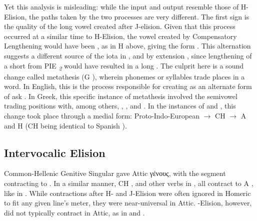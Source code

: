 Yet this analysis is misleading: while the input and output resemble those of H-Elision, the paths taken by the two processes are very different. The first sign is the quality of the long vowel created after J-elision. Given that this process occurred at a similar time to H-Elision, the vowel created by Compensatory Lengthening would have been , as in H  above, giving the form .  This alternation suggests a different source of the iota  in , and by extension , since lengthening of a short  from PIE \textit{\textsubscript{2}} would have resulted in a long . The culprit here is a sound change called metathesis (G ), wherein phonemes or syllables trade places in a word. In English, this is the process responsible for creating  as an alternate form  of ask . In Greek, this specific instance of metathesis involved the semivowel  trading positions with,  among others, , , and . In the instances of  and , this change took place through a medial form: Proto-Indo-European  $\to$ CH  $\to$ A and H  (CH  being identical to Spanish ).

\subsection{Intervocalic Elision}
Common-Hellenic Genitive Singular  gave Attic γένους,\autocite[172]{Sihler_1995} with the segment  contracting to . In a similar manner, CH , and other verbs in , all contract to A , like in . While contractions after H- and J-Elision were often ignored in Homeric to fit any given line's meter, they were near-universal in Attic. \W-Elision, however, did not typically contract in Attic, as in  and .

